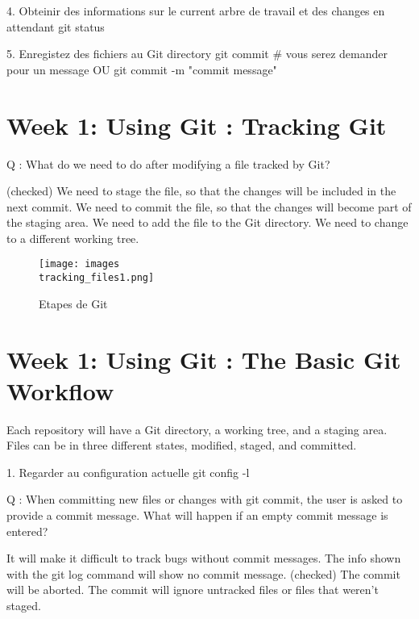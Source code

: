 \documentclass[11pt, onecolumn]{article}
\begin{document}
4. Obteinir des informations sur le current arbre de travail et des changes en attendant
git status 

5. Enregistez des fichiers au Git directory
git commit   # vous serez demander pour un message
OU 
git commit -m "commit message"


\section{Week 1: Using Git : Tracking Git}

Q : What do we need to do after modifying a file tracked by Git?

(checked) We need to stage the file, so that the changes will be included in the next commit.
We need to commit the file, so that the changes will become part of the staging area.
We need to add the file to the Git directory.
We need to change to a different working tree.

\begin{figure}[h]
\begin{center}
\texttt{[image: images\\tracking\_files1.png]}
\end{center}
\caption{Etapes de Git}
\label{tracking_files1}
\end{figure}


\section{Week 1: Using Git : The Basic Git Workflow}

Each repository will have a Git directory, a working tree, and a staging area.
Files can be in three different states, modified, staged, and committed.  

1. Regarder au configuration actuelle
git config -l 

Q : When committing new files or changes with git commit, the user is asked to provide a commit message. What will happen if an empty commit message is entered?

It will make it difficult to track bugs without commit messages.
The info shown with the git log command will show no commit message.
(checked) The commit will be aborted.
The commit will ignore untracked files or files that weren't staged.
\end{document}
